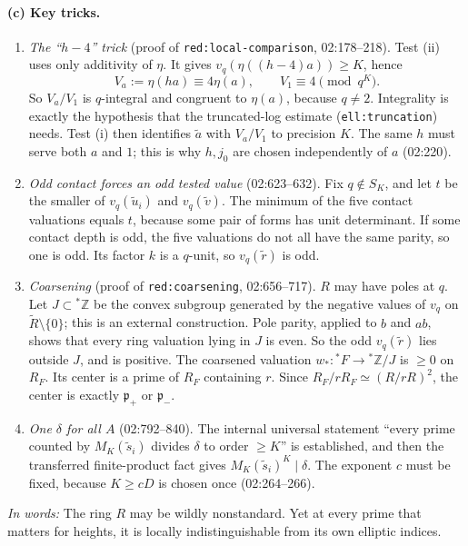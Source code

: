 \documentclass[11pt]{article}
\theoremstyle{definition}
\newcommand{\Z}{\mathbb Z}
\newcommand{\sZ}{{}^*\Z}
\newcommand{\lbl}[1]{\texttt{#1}}
\newcommand{\src}[1]{\textsf{#1}}
\newcommand{\inwords}[1]{\par\smallskip\noindent\emph{In words:} #1\par}
\begin{document}
\paragraph{(c) Key tricks.}
\begin{enumerate}
\item \emph{The ``$h-4$'' trick} (proof of \lbl{red:local-comparison},
\src{02:178--218}).  Test (ii) uses only additivity of $\eta$.  It gives
$v_q(\eta((h-4)a))\ge K$, hence
\[
 V_a:=\eta(ha)\equiv4\eta(a),\qquad V_1\equiv4\pmod{q^K}.
\]
So $V_a/V_1$ is $q$-integral and congruent to $\eta(a)$, because $q\ne2$.
Integrality is exactly the hypothesis that the truncated-log estimate
(\lbl{ell:truncation}) needs.  Test (i) then identifies $\widetilde a$ with
$V_a/V_1$ to precision $K$.  The same $h$ must serve both $a$ and $1$; this
is why $h,j_0$ are chosen independently of $a$ (\src{02:220}).
\item \emph{Odd contact forces an odd tested value} (\src{02:623--632}).
Fix $q\notin S_K$, and let $t$ be the smaller of $v_q(\widetilde u_i)$ and
$v_q(\widetilde v)$.  The minimum of the five contact valuations equals
$t$, because some pair of forms has unit determinant.  If some contact
depth is odd, the five valuations do not all have the same parity, so
one is odd.  Its factor $k$ is a $q$-unit, so $v_q(\widetilde r)$ is odd.
\item \emph{Coarsening} (proof of \lbl{red:coarsening}, \src{02:656--717}).
$R$ may have poles at $q$.  Let $J\subset\sZ$ be the convex subgroup
generated by the negative values of $v_q$ on $\widetilde R\setminus\{0\}$; this is an
external construction.  Pole parity, applied to $b$ and $ab$, shows that
every ring valuation lying in $J$ is even.  So the odd $v_q(\widetilde r)$
lies outside $J$, and is positive.  The coarsened valuation
$w_*:{}^*F\to\sZ/J$ is $\ge0$ on $R_F$.  Its center is a prime of $R_F$
containing $r$.  Since $R_F/rR_F\simeq(R/rR)^2$, the center is exactly
$\mathfrak p_+$ or $\mathfrak p_-$.
\item \emph{One $\delta$ for all $A$} (\src{02:792--840}).  The internal
universal statement ``every prime counted by $M_K(\widetilde s_i)$ divides
$\delta$ to order $\ge K$'' is established, and then the transferred
finite-product fact gives $M_K(\widetilde s_i)^K\mid\delta$.  The exponent
$c$ must be fixed, because $K\ge cD$ is chosen once (\src{02:264--266}).
\end{enumerate}

\inwords{The ring $R$ may be wildly nonstandard.  Yet at every prime that
matters for heights, it is locally indistinguishable from its own elliptic
indices.}
\end{document}
